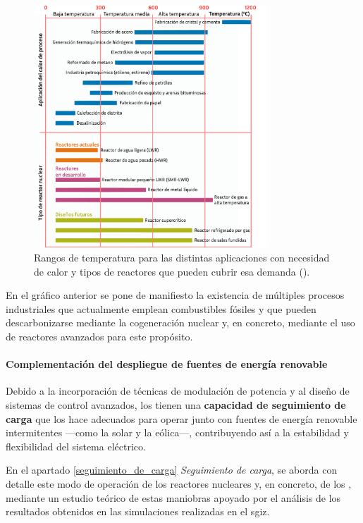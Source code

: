 \begin{figure}[h]
  \centering
  \includegraphics[width=0.78\textwidth]{content/figures/aplicaciones_calor.pdf}
  \caption{Rangos de temperatura para las distintas aplicaciones con necesidad de calor y tipos de reactores que pueden cubrir esa demanda (\cite{wna_heat_applications}).}
  \label{fig:wna_heat_applications}
\end{figure}

En el gráfico anterior se pone de manifiesto la existencia de múltiples procesos industriales que actualmente emplean combustibles fósiles y que pueden descarbonizarse mediante la cogeneración nuclear y, en concreto, mediante el uso de reactores avanzados para este propósito.

\paragraph{Complementación del despliegue de fuentes de energía renovable}

Debido a la incorporación de técnicas de modulación de potencia y al diseño de sistemas de control avanzados, los  tienen una \textbf{capacidad de seguimiento de carga} que los hace adecuados para operar junto con fuentes de energía renovable intermitentes ---como la solar y la eólica---, contribuyendo así a la estabilidad y flexibilidad del sistema eléctrico.

En el apartado \ref{seguimiento_de_carga} \textit{Seguimiento de carga}, se aborda con detalle este modo de operación de los reactores nucleares y, en concreto, de los , mediante un estudio teórico de estas maniobras apoyado por el análisis de los resultados obtenidos en las simulaciones realizadas en el \acrshort{sgiz}.

